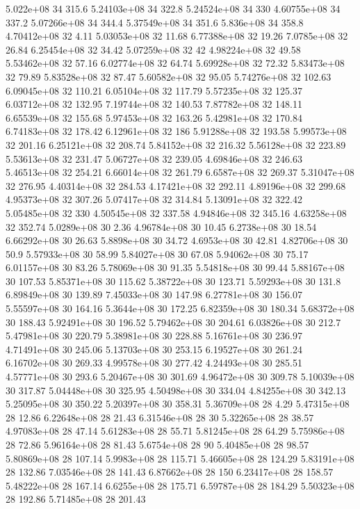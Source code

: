 5.022e+08 34 315.6
5.24103e+08 34 322.8
5.24524e+08 34 330
4.60755e+08 34 337.2
5.07266e+08 34 344.4
5.37549e+08 34 351.6
5.836e+08 34 358.8
4.70412e+08 32 4.11
5.03053e+08 32 11.68
6.77388e+08 32 19.26
7.0785e+08 32 26.84
6.25454e+08 32 34.42
5.07259e+08 32 42
4.98224e+08 32 49.58
5.53462e+08 32 57.16
6.02774e+08 32 64.74
5.69928e+08 32 72.32
5.83473e+08 32 79.89
5.83528e+08 32 87.47
5.60582e+08 32 95.05
5.74276e+08 32 102.63
6.09045e+08 32 110.21
6.05104e+08 32 117.79
5.57235e+08 32 125.37
6.03712e+08 32 132.95
7.19744e+08 32 140.53
7.87782e+08 32 148.11
6.65539e+08 32 155.68
5.97453e+08 32 163.26
5.42981e+08 32 170.84
6.74183e+08 32 178.42
6.12961e+08 32 186
5.91288e+08 32 193.58
5.99573e+08 32 201.16
6.25121e+08 32 208.74
5.84152e+08 32 216.32
5.56128e+08 32 223.89
5.53613e+08 32 231.47
5.06727e+08 32 239.05
4.69846e+08 32 246.63
5.46513e+08 32 254.21
6.66014e+08 32 261.79
6.6587e+08 32 269.37
5.31047e+08 32 276.95
4.40314e+08 32 284.53
4.17421e+08 32 292.11
4.89196e+08 32 299.68
4.95373e+08 32 307.26
5.07417e+08 32 314.84
5.13091e+08 32 322.42
5.05485e+08 32 330
4.50545e+08 32 337.58
4.94846e+08 32 345.16
4.63258e+08 32 352.74
5.0289e+08 30 2.36
4.96784e+08 30 10.45
6.2738e+08 30 18.54
6.66292e+08 30 26.63
5.8898e+08 30 34.72
4.6953e+08 30 42.81
4.82706e+08 30 50.9
5.57933e+08 30 58.99
5.84027e+08 30 67.08
5.94062e+08 30 75.17
6.01157e+08 30 83.26
5.78069e+08 30 91.35
5.54818e+08 30 99.44
5.88167e+08 30 107.53
5.85371e+08 30 115.62
5.38722e+08 30 123.71
5.59293e+08 30 131.8
6.89849e+08 30 139.89
7.45033e+08 30 147.98
6.27781e+08 30 156.07
5.55597e+08 30 164.16
5.3644e+08 30 172.25
6.82359e+08 30 180.34
5.68372e+08 30 188.43
5.92491e+08 30 196.52
5.79462e+08 30 204.61
6.03826e+08 30 212.7
5.47981e+08 30 220.79
5.38981e+08 30 228.88
5.16761e+08 30 236.97
4.71491e+08 30 245.06
5.13703e+08 30 253.15
6.19527e+08 30 261.24
6.16702e+08 30 269.33
4.99578e+08 30 277.42
4.24493e+08 30 285.51
4.57771e+08 30 293.6
5.20467e+08 30 301.69
4.96472e+08 30 309.78
5.10039e+08 30 317.87
5.04448e+08 30 325.95
4.50498e+08 30 334.04
4.84255e+08 30 342.13
5.25095e+08 30 350.22
5.20397e+08 30 358.31
5.36709e+08 28 4.29
5.47315e+08 28 12.86
6.22648e+08 28 21.43
6.31546e+08 28 30
5.32265e+08 28 38.57
4.97083e+08 28 47.14
5.61283e+08 28 55.71
5.81245e+08 28 64.29
5.75986e+08 28 72.86
5.96164e+08 28 81.43
5.6754e+08 28 90
5.40485e+08 28 98.57
5.80869e+08 28 107.14
5.9983e+08 28 115.71
5.46605e+08 28 124.29
5.83191e+08 28 132.86
7.03546e+08 28 141.43
6.87662e+08 28 150
6.23417e+08 28 158.57
5.48222e+08 28 167.14
6.6255e+08 28 175.71
6.59787e+08 28 184.29
5.50323e+08 28 192.86
5.71485e+08 28 201.43
